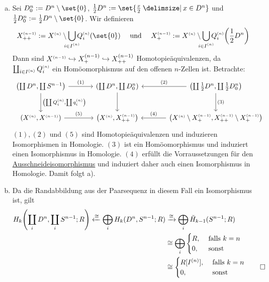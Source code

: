 \begin{beweis}
	\leavevmode
	\begin{enumerate}[a)]
		\item Sei $D^n_0 := D^n \setminus \set{0}$, $\frac{1}{2} D^n := \set{\frac{x}{2} \given x \in D^n}$ und $\frac{1}{2} D^n_0 := \frac{1}{2}D^n \setminus \set{0}$. Wir definieren
		\[
			X^\ssbrace{n-1}_{++} := X^\ssbrace{n} \setminus \bigcup_{\mathclap{i \in I^{(n)}}} Q_i^\ssbrace{n}(\set{0}) \quad \text{ und } \quad 
			X^\ssbrace{n-1}_+ := X^\ssbrace{n} \setminus \bigcup_{\mathclap{i \in I^{(n)}}} Q_i^\ssbrace{n}\enbrace*{\frac{1}{2} D^n}
		\]
		Dann sind 
		$X^{\scriptscriptstyle(n-1)} \hookrightarrow X_+^{(n-1)} \hookrightarrow X_{++}^{(n-1)}$ Homotopieäquivalenzen, da $\coprod_{i \in I^{(n)}} Q^{\scriptscriptstyle(n)}_i$ ein Homöomorphismus auf den offenen 
		$n$-Zellen ist. Betrachte:
		\[
			\begin{tikzcd}[sep=large]
				\enbrace*{\coprod D^n, \coprod S^{n-1}} \dar["\enbrace*{\coprod Q_i^\ssbrace{n}, \coprod q_i^\ssbrace{n}}"] \rar["(1)"] & \enbrace*{\coprod D^n, \coprod D^n_0} \dar &
				\enbrace*{\coprod \frac{1}{2} D^n, \coprod \frac{1}{2} D_0^n} \lar["(2)"'] \dar["(3)"] \\
				\enbrace*{X^\ssbrace{n}, X^\ssbrace{n-1}} \rar["(5)"] & \enbrace*{X^\ssbrace{n}, X^\ssbrace{n-1}_{++}}    
				& \enbrace*{X^\ssbrace{n} \setminus X^\ssbrace{n-1}_+ , X^\ssbrace{n-1}_{++} \setminus X^\ssbrace{n-1}_+} \lar["(4)"'] 
			\end{tikzcd}
		\]
		$(1), (2)$ und $(5)$ sind Homotopieäquivalenzen und induzieren Isomorphismen in Homologie. $(3)$ ist ein Homöomorphismus und induziert einen Isomorphismus in Homologie.
		$(4)$ erfüllt die Vorraussetzungen für den \hyperref[satz:91]{Ausschneideisomorphismus} und induziert daher auch einen Isomorphismus in Homologie. Damit folgt a).
		\item Da die Randabbildung aus der Paarsequenz in diesem Fall ein Isomorphismus ist, gilt 
		\begin{align*}
			H_k \enbrace*{\coprod_i D^n, \coprod_i S^{n-1};R} \xleftarrow{\cong} \bigoplus_i H_k (D^n,S^{n-1};R) &\xrightarrow{\cong} \bigoplus_i \tilde{H}_{k-1}(S^{n-1};R)\\
			&\cong \bigoplus_i \begin{cases}
				R, &\text{ falls }k=n\\
				0, &\text{ sonst}
			\end{cases} \\
			&\cong \begin{cases}
				R[I^{(n)}], &\text{ falls }k=n\\
				0, &\text{ sonst}
			\end{cases} \qedhere
		\end{align*}
	\end{enumerate}
\end{beweis}

